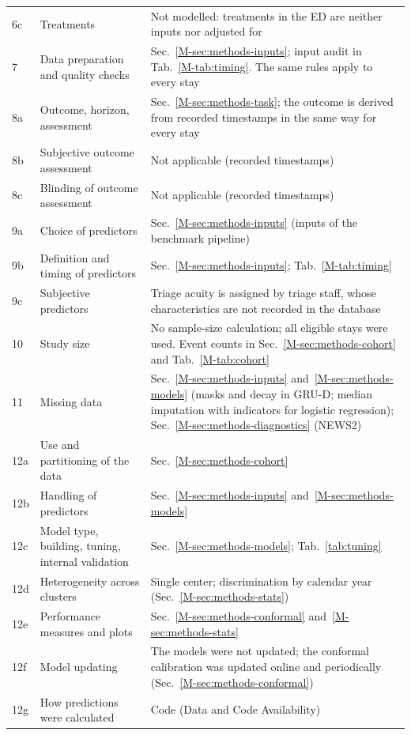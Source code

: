 {\begin{longtable}{@{}p{0.9cm}p{5.4cm}p{10.2cm}@{}}
6c & Treatments & Not modelled: treatments in the ED are neither inputs nor adjusted for \\
7 & Data preparation and quality checks & Sec.~\ref{M-sec:methods-inputs}; input audit in Tab.~\ref{M-tab:timing}. The same rules apply to every stay \\
8a & Outcome, horizon, assessment & Sec.~\ref{M-sec:methods-task}; the outcome is derived from recorded timestamps in the same way for every stay \\
8b & Subjective outcome assessment & Not applicable (recorded timestamps) \\
8c & Blinding of outcome assessment & Not applicable (recorded timestamps) \\
9a & Choice of predictors & Sec.~\ref{M-sec:methods-inputs} (inputs of the benchmark pipeline) \\
9b & Definition and timing of predictors & Sec.~\ref{M-sec:methods-inputs}; Tab.~\ref{M-tab:timing} \\
9c & Subjective predictors & Triage acuity is assigned by triage staff, whose characteristics are not recorded in the database \\
10 & Study size & No sample-size calculation; all eligible stays were used. Event counts in Sec.~\ref{M-sec:methods-cohort} and Tab.~\ref{M-tab:cohort} \\
11 & Missing data & Sec.~\ref{M-sec:methods-inputs} and~\ref{M-sec:methods-models} (masks and decay in GRU-D; median imputation with indicators for logistic regression); Sec.~\ref{M-sec:methods-diagnostics} (NEWS2) \\
12a & Use and partitioning of the data & Sec.~\ref{M-sec:methods-cohort} \\
12b & Handling of predictors & Sec.~\ref{M-sec:methods-inputs} and~\ref{M-sec:methods-models} \\
12c & Model type, building, tuning, internal validation & Sec.~\ref{M-sec:methods-models}; Tab.~\ref{tab:tuning} \\
12d & Heterogeneity across clusters & Single center; discrimination by calendar year (Sec.~\ref{M-sec:methods-stats}) \\
12e & Performance measures and plots & Sec.~\ref{M-sec:methods-conformal} and~\ref{M-sec:methods-stats} \\
12f & Model updating & The models were not updated; the conformal calibration was updated online and periodically (Sec.~\ref{M-sec:methods-conformal}) \\
12g & How predictions were calculated & Code (Data and Code Availability) \\

\end{longtable}}
